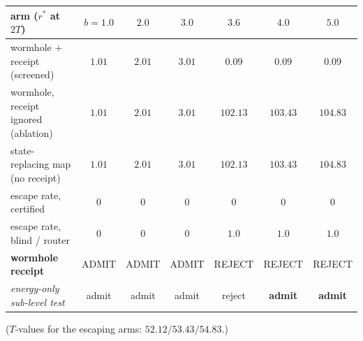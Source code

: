 \documentclass[11pt]{article}
\begin{document}
\begin{center}\small
\begin{tabular}{lcccccc}
\toprule
arm ($r^\ast$ at $2T$) & $b{=}1.0$ & $2.0$ & $3.0$ & $3.6$ & $4.0$ & $5.0$ \\
\midrule
wormhole $+$ receipt (screened) & $1.01$ & $2.01$ & $3.01$ & $\mathbf{0.09}$ & $\mathbf{0.09}$ & $\mathbf{0.09}$ \\
wormhole, receipt ignored (ablation) & $1.01$ & $2.01$ & $3.01$ & $\mathbf{102.13}$ & $\mathbf{103.43}$ & $\mathbf{104.83}$ \\
state-replacing map (no receipt) & $1.01$ & $2.01$ & $3.01$ & $\mathbf{102.13}$ & $\mathbf{103.43}$ & $\mathbf{104.83}$ \\
\midrule
escape rate, certified & $0$ & $0$ & $0$ & $0$ & $0$ & $0$ \\
escape rate, blind / router & $0$ & $0$ & $0$ & $1.0$ & $1.0$ & $1.0$ \\
\textbf{wormhole receipt} & ADMIT & ADMIT & ADMIT & REJECT & REJECT & REJECT \\
\emph{energy-only sub-level test} & admit & admit & admit & reject & \textbf{admit} & \textbf{admit} \\
\bottomrule
\end{tabular}
\end{center}
($T$-values for the escaping arms: $52.12/53.43/54.83$.)
\end{document}

